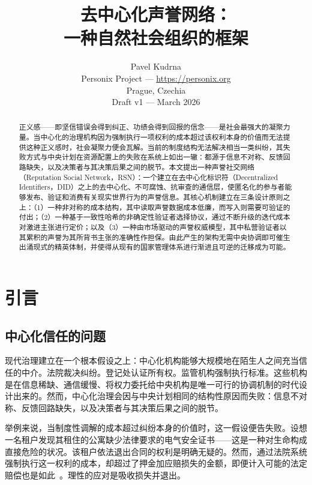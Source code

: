 \documentclass[11pt,a4paper,twocolumn]{article}
\title{\textbf{去中心化声誉网络：\\一种自然社会组织的框架}}
\author{Pavel Kudrna\\Personix Project --- \url{https://personix.org}\\Prague, Czechia\\Draft v1 --- March 2026}
\date{}
\begin{document}
\maketitle

\begin{abstract}
正义感——即坚信错误会得到纠正、功绩会得到回报的信念——是社会最强大的凝聚力量。当中心化的治理机构因为强制执行一项权利的成本超过该权利本身的价值而无法提供这种正义感时，社会凝聚力便会瓦解。当前的制度结构无法解决相当一类纠纷，其失败方式与中央计划在资源配置上的失败在系统上如出一辙：都源于信息不对称、反馈回路缺失，以及决策者与其决策后果之间的脱节。本文提出一种声誉社交网络（Reputation Social Network，RSN）：一个建立在去中心化标识符（Decentralized Identifiers，DID）之上的去中心化、不可腐蚀、抗审查的通信层，使匿名化的参与者能够发布、验证和消费有关现实世界行为的声誉信息。其核心机制建立在三条设计原则之上：（1）一种非对称的成本结构，其中读取声誉数据成本低廉，而写入则需要可验证的付出；（2）一种基于一致性哈希的非确定性验证者选择协议，通过不断升级的迭代成本对激进主张进行定价；以及（3）一种由市场驱动的声誉权威模型，其中私营验证者以其累积的声誉为其所背书主张的准确性作担保。由此产生的架构无需中央协调即可催生出涌现式的精英体制，并使得从现有的国家管理体系进行渐进且可逆的迁移成为可能。
\end{abstract}

\section{引言}

\subsection{中心化信任的问题}

现代治理建立在一个根本假设之上：中心化机构能够大规模地在陌生人之间充当信任的中介。法院裁决纠纷。登记处认证所有权。监管机构强制执行标准。这些机构是在信息稀缺、通信缓慢、将权力委托给中央机构是唯一可行的协调机制的时代设计出来的。然而，中心化治理会因与中央计划相同的结构性原因而失败：信息不对称、反馈回路缺失，以及决策者与其决策后果之间的脱节。

举例来说，当制度性调解的成本超过纠纷本身的价值时，这一假设便告失败。设想一名租户发现其租住的公寓缺少法律要求的电气安全证书——这是一种对生命构成直接危险的状况。该租户依法退出合同的权利是明确无疑的。然而，通过法院系统强制执行这一权利的成本，却超过了押金加应赔损失的金额，即便计入可能的法定赔偿也是如此~\cite{czcourtfees}。理性的应对是吸收损失并退出。
\end{document}
